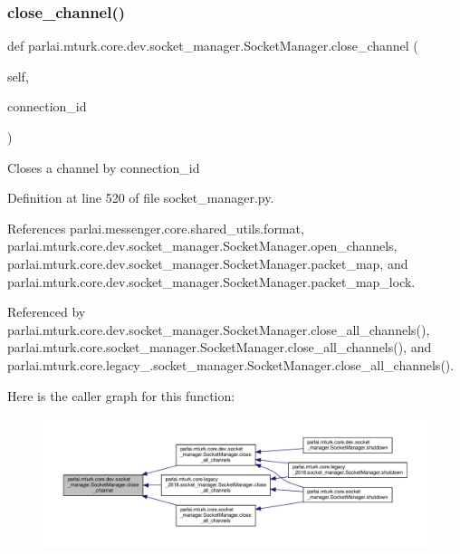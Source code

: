 \subsubsection{\texorpdfstring{close\+\_\+channel()}{close\_channel()}}
{\footnotesize\ttfamily def parlai.\+mturk.\+core.\+dev.\+socket\+\_\+manager.\+Socket\+Manager.\+close\+\_\+channel (\begin{DoxyParamCaption}\item[{}]{self,  }\item[{}]{connection\+\_\+id }\end{DoxyParamCaption})}

\begin{DoxyVerb}Closes a channel by connection_id\end{DoxyVerb}
 

Definition at line 520 of file socket\+\_\+manager.\+py.



References parlai.\+messenger.\+core.\+shared\+\_\+utils.\+format, parlai.\+mturk.\+core.\+dev.\+socket\+\_\+manager.\+Socket\+Manager.\+open\+\_\+channels, parlai.\+mturk.\+core.\+dev.\+socket\+\_\+manager.\+Socket\+Manager.\+packet\+\_\+map, and parlai.\+mturk.\+core.\+dev.\+socket\+\_\+manager.\+Socket\+Manager.\+packet\+\_\+map\+\_\+lock.



Referenced by parlai.\+mturk.\+core.\+dev.\+socket\+\_\+manager.\+Socket\+Manager.\+close\+\_\+all\+\_\+channels(), parlai.\+mturk.\+core.\+socket\+\_\+manager.\+Socket\+Manager.\+close\+\_\+all\+\_\+channels(), and parlai.\+mturk.\+core.\+legacy\+\_.\+socket\+\_\+manager.\+Socket\+Manager.\+close\+\_\+all\+\_\+channels().

Here is the caller graph for this function\+:
\nopagebreak
\begin{figure}[H]
\begin{center}
\leavevmode
\includegraphics[width=350pt]{classparlai_1_1mturk_1_1core_1_1dev_1_1socket__manager_1_1SocketManager_a89ccce497152c72c2a171ef348491d89_icgraph}
\end{center}
\end{figure}
\mbox{\label{classparlai_1_1mturk_1_1core_1_1dev_1_1socket__manager_1_1SocketManager_a5445dd4fe36e2aff2efb2d73c998abcb}} 
